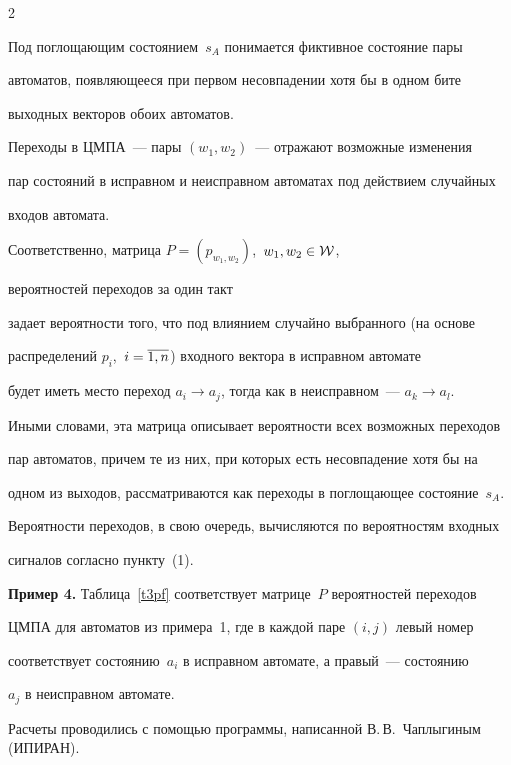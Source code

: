 \begin{multicols}{2}
\begin{itemize}
Под поглощающим со\-сто\-яни\-ем~$s_A$ понимается фиктивное состояние пары


автоматов, появляющееся при первом несовпадении хотя бы в одном бите


выходных векторов обоих автоматов.


\end{itemize}





 Переходы в ЦМПА~--- пары $(w_1,w_2)$~--- отражают возможные изменения


пар состояний в исправном и неисправном автоматах под действием случайных


входов автомата.


Соответственно, матрица $P = (p_{w_1,w_2})$,\ $w_1,w_2\in{\cal W}$,


вероятностей переходов за один такт


задает вероятности того, что под влиянием случайно выбранного (на основе


распределений $p_i$,\ $i=\overline{1,n}$) входного вектора в исправном автомате


будет иметь место переход $a_i\to a_j$, тогда как в неисправном~--- $a_k\to a_l$.


Иными словами, эта матрица описывает вероятности всех возможных переходов


пар автоматов, причем те из них, при которых есть несовпадение хотя бы на


одном из выходов, рассматриваются как переходы в поглощающее со\-сто\-яние~$s_A$.


Вероятности переходов, в свою очередь, вычисляются по вероятностям входных


сигналов согласно пункту~(1).





\bigskip





\noindent


 {\bf Пример 4.} Таблица~\ref{t3pf} соответствует матрице~$P$ вероятностей переходов


ЦМПА для автоматов из примера~1, где в каждой паре $(i,j)$ левый номер


соответствует со\-сто\-янию~$a_i$ в исправном автомате, а правый~--- состоянию


$a_j$ в неисправном автомате.


Расчеты проводились с помощью программы, написанной В.\,В.~Чаплыгиным (ИПИРАН).



\end{multicols}
